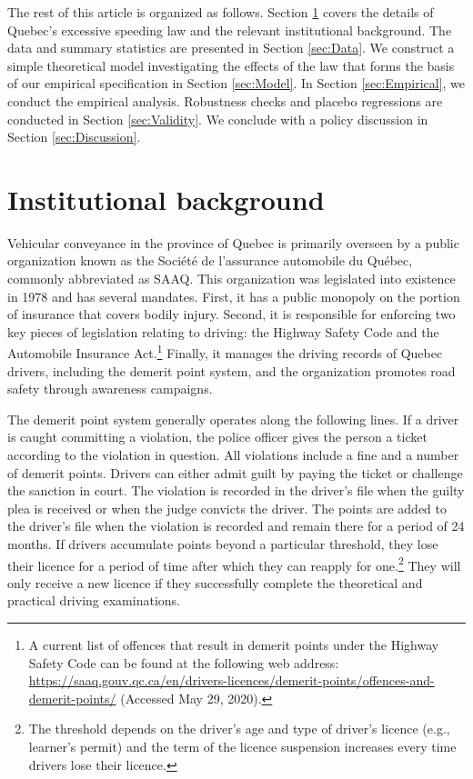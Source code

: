 \documentclass{cje}
\begin{document}
The rest of this article is organized as follows. 
Section \ref{sec:Background} covers the details of Quebec’s excessive speeding law 
and the relevant institutional background. 
The data and summary statistics are presented in Section \ref{sec:Data}. 
% 
We construct a simple theoretical model investigating the effects of the law
that forms the basis of our empirical specification in Section \ref{sec:Model}. 
% 
In Section \ref{sec:Empirical}, we conduct the empirical analysis. 
Robustness checks and placebo regressions are conducted in Section \ref{sec:Validity}. 
We conclude with a policy discussion in Section \ref{sec:Discussion}.




\section{Institutional background}
\label{sec:Background}

Vehicular conveyance in the province of Quebec is primarily overseen by 
a public organization known as the Soci\'{e}t\'{e} de l'assurance automobile du Qu\'{e}bec, 
commonly abbreviated as SAAQ. 
This organization was legislated into existence in 1978 and has several mandates. 
First, it has a public monopoly on the portion of insurance that covers bodily injury. 
Second, it is responsible for enforcing two key pieces of legislation relating to driving: 
the Highway Safety Code and the Automobile Insurance Act.\footnote{%
%
A current list of offences that result in demerit points under the Highway Safety Code 
can be found at the following web address: 
\url{https://saaq.gouv.qc.ca/en/drivers-licences/demerit-points/offences-and-demerit-points/} (Accessed May 29, 2020).}
%
Finally, it manages the driving records of Quebec drivers, 
including the demerit point system, 
and the organization promotes road safety through awareness campaigns.

The demerit point system generally operates along the following lines. 
If a driver is caught committing a violation, the police officer 
gives the person a ticket according to the violation in question. 
All violations include a fine and a number of demerit points. 
Drivers can either admit guilt by paying the ticket or challenge the sanction in court. 
The violation is recorded in the driver’s file when the guilty plea is received 
or when the judge convicts the driver. 
The points are added to the driver’s file when the violation is recorded 
and remain there for a period of 24 months. 
If drivers accumulate points beyond a particular threshold, 
they lose their licence for a period of time 
after which they can reapply for one.\footnote{%
%
The threshold depends on the driver's age and type of driver’s licence 
(e.g., learner’s permit)
and the term of the licence suspension 
increases every time drivers lose their licence.}
%
They will only receive a new licence if they successfully complete 
the theoretical and practical driving examinations.
\end{document}
